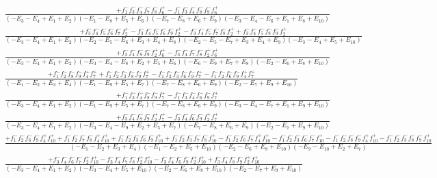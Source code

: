 \documentclass{article}
\begin{document}
\[\begin{array}{rcl}
\frac{+f_{1}^{-}f_{3}^{-}f_{4}^{-}f_{7}^{-}f_{8}^{-}f_{6}^{+}-f_{1}^{-}f_{3}^{-}f_{4}^{-}f_{8}^{-}f_{9}^{-}f_{6}^{+}}{(-E_{3}-E_{4}+E_{1}+E_{2})(-E_{1}-E_{8}+E_{5}+E_{6})(-E_{7}-E_{8}+E_{6}+E_{9})(-E_{3}-E_{4}-E_{6}+E_{1}+E_{8}+E_{10})}\\
\frac{+f_{3}^{-}f_{4}^{-}f_{5}^{-}f_{6}^{-}f_{7}^{-}f_{2}^{+}-f_{3}^{-}f_{4}^{-}f_{5}^{-}f_{6}^{-}f_{9}^{-}f_{2}^{+}-f_{3}^{-}f_{4}^{-}f_{5}^{-}f_{7}^{-}f_{8}^{-}f_{2}^{+}+f_{3}^{-}f_{4}^{-}f_{5}^{-}f_{8}^{-}f_{9}^{-}f_{2}^{+}}{(-E_{3}-E_{4}+E_{1}+E_{2})(-E_{2}-E_{5}-E_{6}+E_{3}+E_{4}+E_{8})(-E_{2}-E_{5}-E_{7}+E_{3}+E_{4}+E_{9})(-E_{3}-E_{4}+E_{5}+E_{10})}\\
\frac{+f_{3}^{-}f_{4}^{-}f_{8}^{-}f_{9}^{-}f_{2}^{+}f_{6}^{+}-f_{3}^{-}f_{4}^{-}f_{7}^{-}f_{8}^{-}f_{2}^{+}f_{6}^{+}}{(-E_{3}-E_{4}+E_{1}+E_{2})(-E_{3}-E_{4}-E_{8}+E_{2}+E_{5}+E_{6})(-E_{6}-E_{9}+E_{7}+E_{8})(-E_{2}-E_{6}+E_{8}+E_{10})}\\
\frac{+f_{1}^{-}f_{2}^{-}f_{8}^{-}f_{9}^{-}f_{4}^{+}f_{7}^{+}+f_{1}^{-}f_{2}^{-}f_{3}^{-}f_{8}^{-}f_{9}^{-}f_{7}^{+}-f_{1}^{-}f_{2}^{-}f_{3}^{-}f_{6}^{-}f_{9}^{-}f_{7}^{+}-f_{1}^{-}f_{2}^{-}f_{6}^{-}f_{9}^{-}f_{4}^{+}f_{7}^{+}}{(-E_{1}-E_{2}+E_{3}+E_{4})(-E_{1}-E_{9}+E_{5}+E_{7})(-E_{7}-E_{8}+E_{6}+E_{9})(-E_{2}-E_{7}+E_{9}+E_{10})}\\
\frac{+f_{1}^{-}f_{3}^{-}f_{4}^{-}f_{8}^{-}f_{9}^{-}f_{7}^{+}-f_{1}^{-}f_{3}^{-}f_{4}^{-}f_{6}^{-}f_{9}^{-}f_{7}^{+}}{(-E_{3}-E_{4}+E_{1}+E_{2})(-E_{1}-E_{9}+E_{5}+E_{7})(-E_{7}-E_{8}+E_{6}+E_{9})(-E_{3}-E_{4}-E_{7}+E_{1}+E_{9}+E_{10})}\\
\frac{+f_{3}^{-}f_{4}^{-}f_{8}^{-}f_{9}^{-}f_{2}^{+}f_{7}^{+}-f_{3}^{-}f_{4}^{-}f_{6}^{-}f_{9}^{-}f_{2}^{+}f_{7}^{+}}{(-E_{3}-E_{4}+E_{1}+E_{2})(-E_{3}-E_{4}-E_{9}+E_{2}+E_{5}+E_{7})(-E_{7}-E_{8}+E_{6}+E_{9})(-E_{2}-E_{7}+E_{9}+E_{10})}\\
\frac{+f_{1}^{-}f_{2}^{-}f_{6}^{-}f_{9}^{-}f_{4}^{+}f_{10}^{+}+f_{1}^{-}f_{2}^{-}f_{7}^{-}f_{8}^{-}f_{4}^{+}f_{10}^{+}+f_{1}^{-}f_{2}^{-}f_{3}^{-}f_{6}^{-}f_{9}^{-}f_{10}^{+}+f_{1}^{-}f_{2}^{-}f_{3}^{-}f_{7}^{-}f_{8}^{-}f_{10}^{+}-f_{1}^{-}f_{2}^{-}f_{6}^{-}f_{7}^{-}f_{4}^{+}f_{10}^{+}-f_{1}^{-}f_{2}^{-}f_{3}^{-}f_{6}^{-}f_{7}^{-}f_{10}^{+}-f_{1}^{-}f_{2}^{-}f_{8}^{-}f_{9}^{-}f_{4}^{+}f_{10}^{+}-f_{1}^{-}f_{2}^{-}f_{3}^{-}f_{8}^{-}f_{9}^{-}f_{10}^{+}}{(-E_{1}-E_{2}+E_{3}+E_{4})(-E_{1}-E_{2}+E_{5}+E_{10})(-E_{2}-E_{6}+E_{8}+E_{10})(-E_{9}-E_{10}+E_{2}+E_{7})}\\
\frac{+f_{3}^{-}f_{4}^{-}f_{6}^{-}f_{7}^{-}f_{2}^{+}f_{10}^{+}-f_{3}^{-}f_{4}^{-}f_{7}^{-}f_{8}^{-}f_{2}^{+}f_{10}^{+}-f_{3}^{-}f_{4}^{-}f_{6}^{-}f_{9}^{-}f_{2}^{+}f_{10}^{+}+f_{3}^{-}f_{4}^{-}f_{8}^{-}f_{9}^{-}f_{2}^{+}f_{10}^{+}}{(-E_{3}-E_{4}+E_{1}+E_{2})(-E_{3}-E_{4}+E_{5}+E_{10})(-E_{2}-E_{6}+E_{8}+E_{10})(-E_{2}-E_{7}+E_{9}+E_{10})}\\

\end{array}\]
\end{document}
